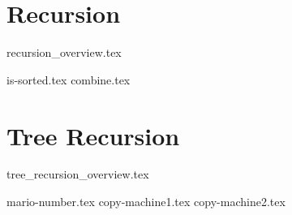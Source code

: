\documentclass{exam}
\begin{document}
\section{Recursion}
{recursion_overview.tex}
\begin{questions}
{is-sorted.tex}
{combine.tex}
\end{questions}

\pagebreak

\section{Tree Recursion}
{tree_recursion_overview.tex}
\pagebreak
\begin{questions}
{mario-number.tex}
{copy-machine1.tex}
{copy-machine2.tex}
\end{questions}
\end{document}
